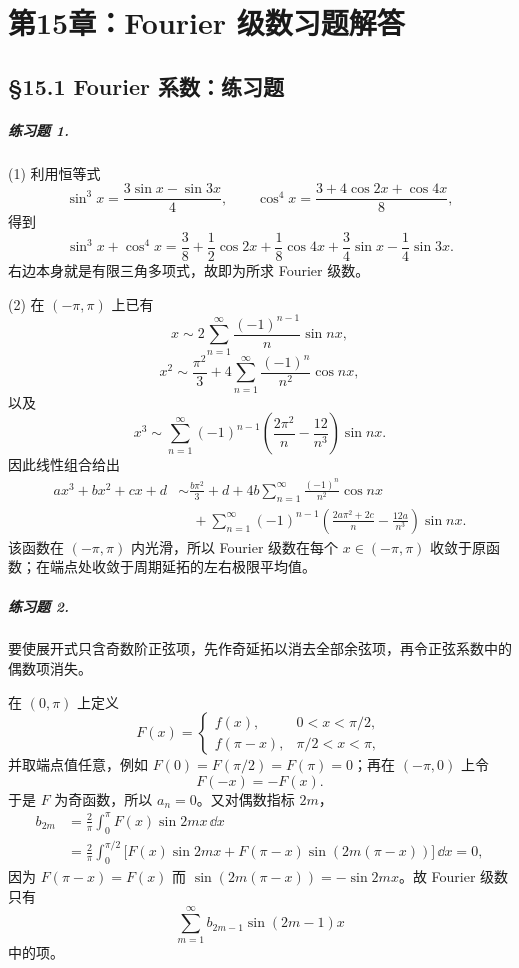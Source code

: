 
\chapter*{第15章：Fourier 级数习题解答}
\section*{§15.1 Fourier 系数：练习题}

\paragraph{练习题 1.}
\begin{xsolution}
(1) 利用恒等式
\[
  \sin^3x=\frac{3\sin x-\sin3x}{4},\qquad
  \cos^4x=\frac{3+4\cos2x+\cos4x}{8},
\]
得到
\[
  \sin^3x+\cos^4x
  =\frac38+\frac12\cos2x+\frac18\cos4x
   +\frac34\sin x-\frac14\sin3x.
\]
右边本身就是有限三角多项式，故即为所求 Fourier 级数。

(2) 在 $(-\pi,\pi)$ 上已有
\[
  x\sim2\sum_{n=1}^{\infty}\frac{(-1)^{n-1}}n\sin nx,
\]
\[
  x^2\sim\frac{\pi^2}{3}+4\sum_{n=1}^{\infty}\frac{(-1)^n}{n^2}\cos nx,
\]
以及
\[
  x^3\sim\sum_{n=1}^{\infty}(-1)^{n-1}
  \left(\frac{2\pi^2}{n}-\frac{12}{n^3}\right)\sin nx.
\]
因此线性组合给出
\begin{align*}
  ax^3+bx^2+cx+d
  &\sim \frac{b\pi^2}{3}+d
   +4b\sum_{n=1}^{\infty}\frac{(-1)^n}{n^2}\cos nx\\
  &\quad+
  \sum_{n=1}^{\infty}(-1)^{n-1}
  \left(\frac{2a\pi^2+2c}{n}-\frac{12a}{n^3}\right)\sin nx.
\end{align*}
该函数在 $(-\pi,\pi)$ 内光滑，所以 Fourier 级数在每个 $x\in(-\pi,\pi)$ 收敛于原函数；在端点处收敛于周期延拓的左右极限平均值。
\end{xsolution}

\paragraph{练习题 2.}
\begin{xsolution}
要使展开式只含奇数阶正弦项，先作奇延拓以消去全部余弦项，再令正弦系数中的偶数项消失。

在 $(0,\pi)$ 上定义
\[
  F(x)=
  \begin{cases}
    f(x),&0<x<\pi/2,\\
    f(\pi-x),&\pi/2<x<\pi,
  \end{cases}
\]
并取端点值任意，例如 $F(0)=F(\pi/2)=F(\pi)=0$；再在 $(-\pi,0)$ 上令
\[
  F(-x)=-F(x).
\]
于是 $F$ 为奇函数，所以 $a_n=0$。又对偶数指标 $2m$，
\begin{align*}
  b_{2m}
  &=\frac2\pi\int_0^\pi F(x)\sin2mx\,\dd x\\
  &=\frac2\pi\int_0^{\pi/2}
  \bigl[F(x)\sin2mx+F(\pi-x)\sin(2m(\pi-x))\bigr]\,\dd x=0,
\end{align*}
因为 $F(\pi-x)=F(x)$ 而
$\sin(2m(\pi-x))=-\sin2mx$。故 Fourier 级数只有
\[
  \sum_{m=1}^{\infty}b_{2m-1}\sin(2m-1)x
\]
中的项。
\end{xsolution}

